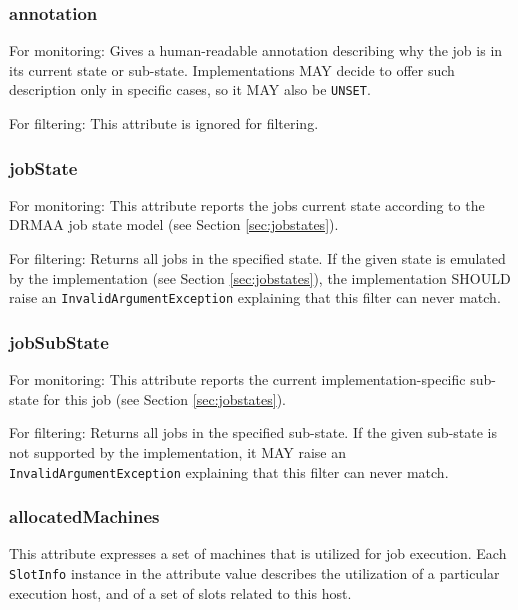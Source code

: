 \documentclass{article}
\newcommand{\h}[1]{\lstinline|#1|}
\newcommand{\rat}[1]{}
\begin{document}
\subsubsection{annotation}

For monitoring: Gives a human-readable annotation describing why the job is in its current state or sub-state. Implementations MAY decide to offer such description only in specific cases, so it MAY also be \h{UNSET}.

For filtering: This attribute is ignored for filtering.

\subsubsection{jobState}

For monitoring: This attribute reports the jobs current state according to the DRMAA job state model (see Section \ref{sec:jobstates}).

For filtering: Returns all jobs in the specified state. If the given state is emulated by the implementation (see Section \ref{sec:jobstates}), the implementation SHOULD raise an \h{InvalidArgumentException} explaining that this filter can never match.

\subsubsection{jobSubState}
\label{sec:jobSubState}

For monitoring: This attribute reports the current implementation-specific sub-state for this job (see Section \ref{sec:jobstates}).

For filtering: Returns all jobs in the specified sub-state. If the given sub-state is not supported by the implementation, it MAY raise an \h{InvalidArgumentException} explaining that this filter can never match.

\rat{As the jobSubState is an opaque object, any invalid usage may lead to a crash of the library. For this reason, the JUne 29th 2011 conf call decided to use only MAY here, in order to reflect the potentially missing reflection capabilities in the languages.}

\subsubsection{allocatedMachines}

This attribute expresses a set of machines that is utilized for job execution. Each \h{SlotInfo} instance in the attribute value describes the utilization of a particular execution host, and of a set of slots related to this host.
\end{document}
